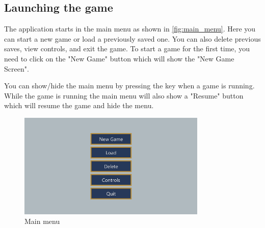 \subsection{Launching the game}
The application starts in the main menu as shown in \autoref{fig:main_menu}.
Here you can start a new game or load a previously saved one.
You can also delete previous saves, view controls, and exit the game.
To start a game for the first time, you need to click on the "New Game" button which will show the "New Game Screen".

You can show/hide the main menu by pressing the \keys{\escwin} key when a game is running.
While the game is running the main menu will also show a "Resume" button which will resume the game and hide the menu.

\begin{figure}[H]
    \centering
    \includegraphics[width=0.8\textwidth]{sections/user_manual/resources/main-menu.png}
    \caption{Main menu}
    \label{fig:main_menu}
\end{figure}